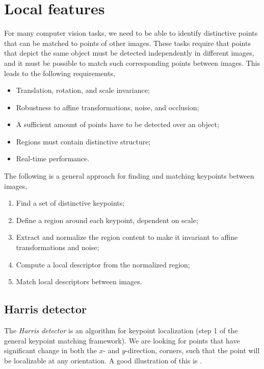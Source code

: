 \section{Local features}

For many computer vision tasks, we need to be able to identify distinctive
points that can be matched to points of other images.
These tasks require that points that depict the same object must be detected
independently in different images, and it must be possible to match such
corresponding points between images. This leads to the following requirements,
\begin{itemize}
  \item Translation, rotation, and scale invariance;
  \item Robustness to affine transformations, noise, and occlusion;
  \item A sufficient amount of points have to be detected over an object;
  \item Regions must contain distinctive structure;
  \item Real-time performance.
\end{itemize}

The following is a general approach for finding and matching keypoints between
images,
\begin{enumerate}
  \item Find a set of distinctive keypoints;
  \item Define a region around each keypoint, dependent on scale;
  \item Extract and normalize the region content to make it invariant to
    affine transformations and noise;
  \item Compute a local descriptor from the normalized region;
  \item Match local descriptors between images.
\end{enumerate}

\subsection{Harris detector}

The \textit{Harris detector} \citep{harris1988combined} is an algorithm for
keypoint localization (step 1 of the general keypoint matching framework). We
are looking for points that have significant change in both the $x$- and
$y$-direction, \ie corners, such that the point will be localizable at any
orientation. A good illustration of this is .

